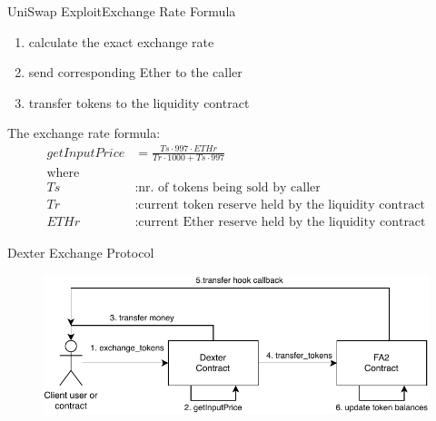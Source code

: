 \begin{frame}{UniSwap Exploit}{Exchange Rate Formula}
\begin{enumerate}
    \item calculate the exact exchange rate
    \item send corresponding Ether to the caller
    \item transfer tokens to the liquidity contract
\end{enumerate}
The exchange rate formula:
\begin{equation*}
\begin{split}
getInputPrice &= \frac{Ts \cdot 997 \cdot ETHr}{Tr \cdot 1000 + Ts \cdot 997}\\
\text{where}&\\
Ts&: \text{nr. of tokens being sold by caller} \\
Tr&: \text{current token reserve held by the liquidity contract} \\
ETHr&: \text{current Ether reserve held by the liquidity contract}
\end{split}
\end{equation*}
\end{frame}

\begin{frame}{Dexter Exchange Protocol}
\begin{figure}
\includegraphics[scale=0.85]{media/Dexter-exchange-diagram.pdf}
\end{figure}
\end{frame}